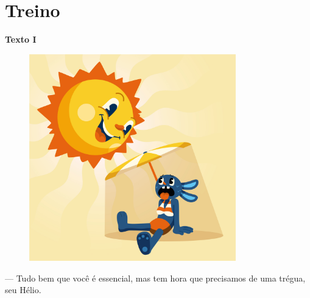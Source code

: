 
\section*{Treino}

\hspace\parindent{Observe os dois textos a seguir.}

\begin{myquote}
\begin{center}
\textbf{Texto I}
\end{center}

\begin{figure}[H]
\centering\includegraphics[width=0.8\textwidth]{./imgSAEB_6_POR/freepik/PORT_6_IMG-18.jpeg}
\end{figure}

--- Tudo bem que você é essencial, mas tem hora que precisamos de uma
trégua, seu Hélio.
\end{myquote}

